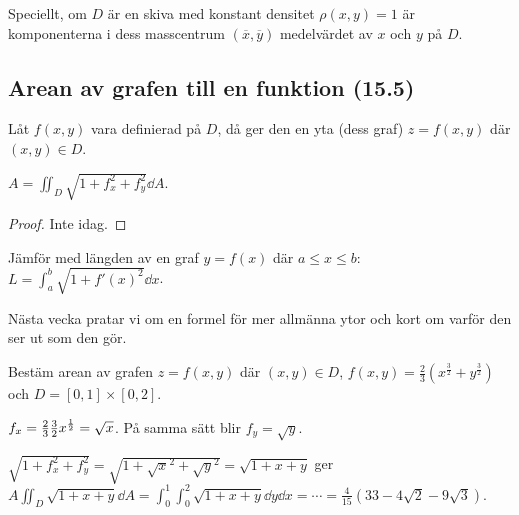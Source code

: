 \documentclass[a4paper]{article}
\begin{document}
Speciellt, om \(
    D
\) är en skiva med konstant densitet \(
    \rho(x,y) = 1
\) är komponenterna i dess masscentrum \(
    (\overline{x}, \overline{y})
\) medelvärdet av \(
    x
\) och \(
    y
\) på \(
    D
\).

\subsection{Arean av grafen till en funktion (15.5)}
Låt \(
    f(x,y)
\) vara definierad på \(
    D
\), då ger den en yta (dess graf) \(
    z=f(x,y)
\) där \(
    (x,y) \in D
\). 

\begin{sats}
    \(
        A = \iint_D \sqrt{1+f_x^2 + f_y^2} \dd A
    \).

    \begin{proof}
        Inte idag. %
    \end{proof}
\end{sats}

Jämför med längden av en graf \(
    y=f(x)
\) där \(
    a \leq x \leq b
\): \(
    L = \int_a^b \sqrt{1+{f'(x)}^2} \dd x
\).

Nästa vecka pratar vi om en formel för mer allmänna ytor och kort om varför
den ser ut som den gör.

\begin{ex}
    Bestäm arean av grafen \(
        z = f(x,y)
    \) där \(
        (x,y) \in D
    \), \(
        f(x,y) = \frac{2}{3}( x^{\frac{3}{2}} + y^{\frac{3}{2}} )
    \) och \(
        D = [0,1] \times [0,2]
    \).

    \(
        f_x = \frac{2}{3} \frac{3}{2} x^{\frac{1}{2}} = \sqrt{x}
    \). På samma sätt blir \(
        f_y = \sqrt{y}
    \).

    \(
        \sqrt{ 1 + f_x^2 + f_y^2 } = \sqrt{1 + \sqrt{x}^2 + \sqrt{y}^2} 
            = \sqrt{1+x+y} 
    \) ger \(
        A \iint_D \sqrt{1+x+y} \dd A
            = \int_0^1 \int_0^2 \sqrt{1+x+y} \dd y \dd x
            = \cdots = \frac{4}{15} (33 - 4 \sqrt{2} - 9 \sqrt{3})
    \).
\end{ex}
\end{document}
